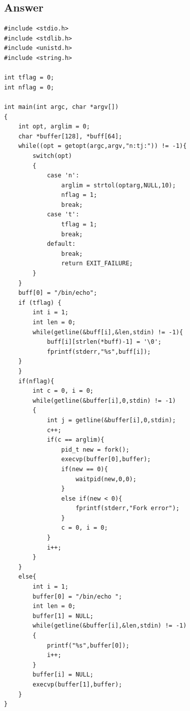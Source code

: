 \documentclass[
	12pt, %
]{fphw}
\begin{document}
\subsection*{Answer}
\begin{lstlisting}[style=CStyle]
#include <stdio.h>
#include <stdlib.h>
#include <unistd.h>
#include <string.h>

int tflag = 0;
int nflag = 0;

int main(int argc, char *argv[])
{
	int opt, arglim = 0;
	char *buffer[128], *buff[64];
	while((opt = getopt(argc,argv,"n:tj:")) != -1){
		switch(opt)
		{
			case 'n':
				arglim = strtol(optarg,NULL,10);
				nflag = 1;
				break;
			case 't':
				tflag = 1;
				break;
			default:
				break;
				return EXIT_FAILURE;
		}
	}
	buff[0] = "/bin/echo";
	if (tflag) {
		int i = 1;
		int len = 0;
		while(getline(&buff[i],&len,stdin) != -1){
			buff[i][strlen(*buff)-1] = '\0';
			fprintf(stderr,"%s",buff[i]);
	}
	}
	if(nflag){
		int c = 0, i = 0;
		while(getline(&buffer[i],0,stdin) != -1)
		{
			int j = getline(&buffer[i],0,stdin);
			c++;
			if(c == arglim){
				pid_t new = fork();
				execvp(buffer[0],buffer);
				if(new == 0){
					waitpid(new,0,0);
				}
				else if(new < 0){
					fprintf(stderr,"Fork error");
				}
				c = 0, i = 0;
			}
			i++;
		}
	} 
	else{
		int i = 1;
		buffer[0] = "/bin/echo ";
		int len = 0;
		buffer[1] = NULL;
		while(getline(&buffer[i],&len,stdin) != -1)
		{
			printf("%s",buffer[0]);
			i++;
		}
		buffer[i] = NULL;
		execvp(buffer[1],buffer);
	}
}
\end{lstlisting}
\end{document}
